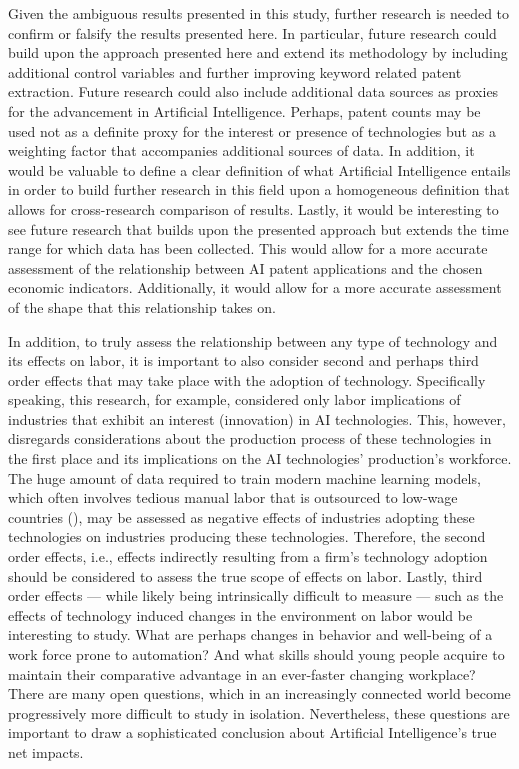\documentclass[
  12pt,
  a4paperpaper,
]{article}
\begin{document}
Given the ambiguous results presented in this study, further research is
needed to confirm or falsify the results presented here. In particular,
future research could build upon the approach presented here and extend
its methodology by including additional control variables and further
improving keyword related patent extraction. Future research could also
include additional data sources as proxies for the advancement in
Artificial Intelligence. Perhaps, patent counts may be used not as a
definite proxy for the interest or presence of technologies but as a
weighting factor that accompanies additional sources of data. In
addition, it would be valuable to define a clear definition of what
Artificial Intelligence entails in order to build further research in
this field upon a homogeneous definition that allows for cross-research
comparison of results. Lastly, it would be interesting to see future
research that builds upon the presented approach but extends the time
range for which data has been collected. This would allow for a more
accurate assessment of the relationship between AI patent applications
and the chosen economic indicators. Additionally, it would allow for a
more accurate assessment of the shape that this relationship takes on.

In addition, to truly assess the relationship between any type of
technology and its effects on labor, it is important to also consider
second and perhaps third order effects that may take place with the
adoption of technology. Specifically speaking, this research, for
example, considered only labor implications of industries that exhibit
an interest (innovation) in AI technologies. This, however, disregards
considerations about the production process of these technologies in the
first place and its implications on the AI technologies' production's
workforce. The huge amount of data required to train modern machine
learning models, which often involves tedious manual labor that is
outsourced to low-wage countries
(), may be assessed as
negative effects of industries adopting these technologies on industries
producing these technologies. Therefore, the second order effects, i.e.,
effects indirectly resulting from a firm's technology adoption should be
considered to assess the true scope of effects on labor. Lastly, third
order effects --- while likely being intrinsically difficult to measure
--- such as the effects of technology induced changes in the environment
on labor would be interesting to study. What are perhaps changes in
behavior and well-being of a work force prone to automation? And what
skills should young people acquire to maintain their comparative
advantage in an ever-faster changing workplace? There are many open
questions, which in an increasingly connected world become progressively
more difficult to study in isolation. Nevertheless, these questions are
important to draw a sophisticated conclusion about Artificial
Intelligence's true net impacts.
\end{document}

